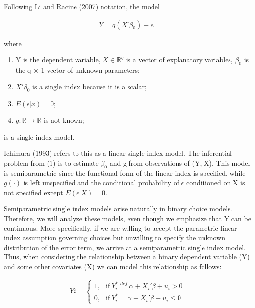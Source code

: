 \documentclass[a4paper]{article}
\begin{document}
Following Li and Racine (2007) notation, the model 

\begin{eqnarray}
Y = g(X'\beta_0) + \epsilon,  %
\end{eqnarray}

where

\begin{enumerate}
	\item Y is the dependent variable, $X\in \mathbb{R}^{q}$ is a vector of explanatory variables, $\beta_0$ is the q $\times$ 1 vector of unknown parameters; %
	\item $X'\beta_0$ is a single index because it is a scalar;
	\item $ E(\epsilon|x) = 0 $;
	\item $g: \mathbb{R} \rightarrow \mathbb{R} $ is not known; %
\end{enumerate}

is a single index model.

\vspace{5mm} 

Ichimura (1993) refers to this as a linear single index model. The inferential problem from (1) is to estimate $\beta_0$ and g from observations of (Y, X). This model is semiparametric since the functional form of the linear index is specified, while $g(\cdot)$ is left unspecified and the conditional probability of $\epsilon$ conditioned on X is not specified except $ E(\epsilon|X) = 0 $. 

Semiparametric single index models arise naturally in binary choice models. Therefore, we will analyze these models, even though we emphasize that Y can be continuous. More specifically, if we are willing to accept the parametric linear index assumption governing choices but unwilling to specify the unknown distribution of the error term, we arrive at a semiparametric single index model. Thus, when considering the relationship between a binary dependent variable (Y) and some other covariates (X) we can model this relationship as follows:

\begin{eqnarray}
    Yi = 
    \begin{cases}
      1, & \text{if}\ Y_i^* \stackrel{def}{=} \alpha + X_i'\beta + u_i > 0 \\
      0, & \text{if}\ Y_i^* = \alpha + X_i'\beta + u_i \leq 0
    \end{cases}
\end{eqnarray}
\end{document}
